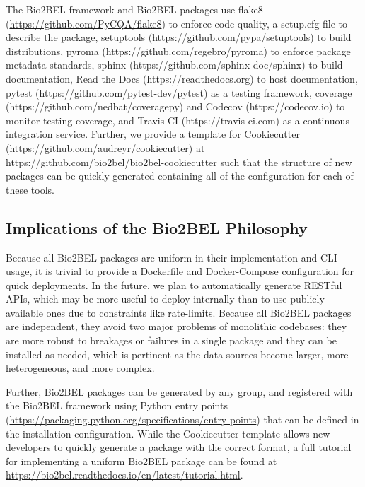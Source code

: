 The Bio2BEL framework and Bio2BEL packages use flake8 (\url{https://github.com/PyCQA/flake8}) to enforce code quality, a setup.cfg file to describe the package, setuptools (https://github.com/pypa/setuptools) to build distributions, pyroma (https://github.com/regebro/pyroma) to enforce package metadata standards, sphinx (https://github.com/sphinx-doc/sphinx) to build documentation, Read the Docs (https://readthedocs.org) to host documentation, pytest (https://github.com/pytest-dev/pytest) as a testing framework, coverage (https://github.com/nedbat/coveragepy) and Codecov (https://codecov.io) to monitor testing coverage, and Travis-CI (https://travis-ci.com) as a continuous integration service.
Further, we provide a template for Cookiecutter (https://github.com/audreyr/cookiecutter) at https://github.com/bio2bel/bio2bel-cookiecutter such that the structure of new packages can be quickly generated containing all of the configuration for each of these tools.

\subsection*{Implications of the Bio2BEL Philosophy}
Because all Bio2BEL packages are uniform in their implementation and CLI usage, it is trivial to provide a Dockerfile and Docker-Compose configuration for quick deployments.
In the future, we plan to automatically generate RESTful APIs, which may be more useful to deploy internally than to use publicly available ones due to constraints like rate-limits.
Because all Bio2BEL packages are independent, they avoid two major problems of monolithic codebases: they are more robust to breakages or failures in a single package and they can be installed as needed, which is pertinent as the data sources become larger, more heterogeneous, and more complex.

Further, Bio2BEL packages can be generated by any group, and registered with the Bio2BEL framework using Python entry points (\url{https://packaging.python.org/specifications/entry-points}) that can be defined in the installation configuration.
While the Cookiecutter template allows new developers to quickly generate a package with the correct format, a full tutorial for implementing a uniform Bio2BEL package can be found at \url{https://bio2bel.readthedocs.io/en/latest/tutorial.html}.

